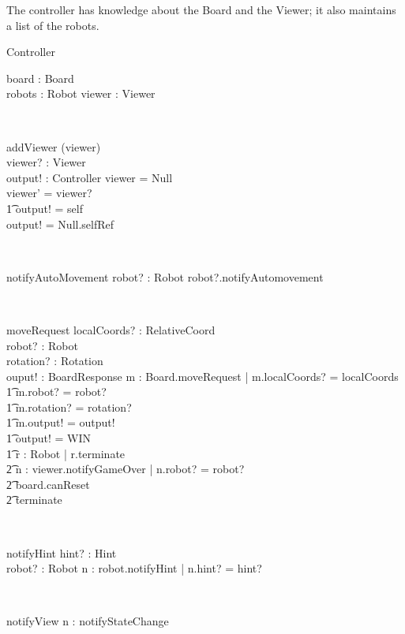 \documentclass[12pt]{article}
\begin{document}
The controller has knowledge about the Board and the Viewer; it also maintains a list of the robots.
\begin{class}{Controller}
\begin{state}
board : Board \\
robots : \power Robot
viewer : Viewer
\end{state}\\
\begin{schema}{addViewer}
\Delta (viewer) \\
viewer? : Viewer \\
output! : Controller
\where
\IF viewer = Null \\
\THEN viewer' = viewer? \\ \t1
output! = self \\
\ELSE output! = Null.selfRef
\end{schema}\\
\begin{schema}{notifyAutoMovement}
robot? : Robot
\where
robot?.notifyAutomovement
\end{schema}\\
\begin{schema}{moveRequest}
localCoords? : RelativeCoord \\
robot? : Robot \\
rotation? : Rotation \\
ouput! : BoardResponse
\where
\exists m : Board.moveRequest | m.localCoords? = localCoords \\ \t1
m.robot? = robot? \\ \t1
m.rotation? = rotation? \\ \t1
m.output! = output! \\ \t1
\IF output! = WIN \\ \t1
\THEN \forall r : Robot | r.terminate \\ \t2
\exists n : viewer.notifyGameOver | n.robot? = robot? \\ \t2
board.canReset \\ \t2
terminate
\end{schema}\\
\begin{schema}{notifyHint}
hint? : Hint \\
robot? : Robot
\where
\exists n : robot.notifyHint | n.hint? = hint?
\end{schema}\\
\begin{schema}{notifyView}
\where
\exists n : notifyStateChange
\end{schema}

\end{class}
\end{document}
